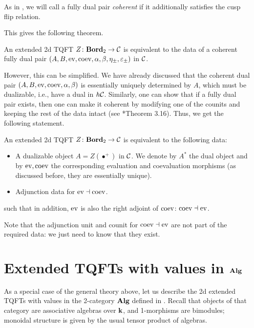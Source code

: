 As in , we will call a fully dual pair \emph{coherent}
if it additionally satisfies the cusp flip relation.

This gives the following theorem.

\begin{theorem}\label{t:2d-etqft-classification1}
  An extended 2d TQFT $Z\colon \mathbf{Bord}_2\to \mathcal{C}$ is equivalent to the
  data of a coherent fully dual pair
  $(A, B, \operatorname{ev}, \operatorname{coev}, \alpha, \beta, \eta_\pm, \varepsilon_\pm)$ in $\mathcal{C}$.
\end{theorem}

However, this can be simplified. We have already discussed that the
coherent dual pair $(A, B, \operatorname{ev}, \operatorname{coev}, \alpha, \beta)$ is essentially
uniquely determined by $A$, which must be dualizable, i.e., have a
dual in $h\mathcal{C}$. Similarly, one can show that if a fully dual pair exists,
then one can make it coherent by modifying one of the counits and keeping
the rest of the data intact (see *{Theorem 3.16}). Thus, we
get the following statement.

\begin{theorem}\label{t:2d-etqft-classification2}
  An extended 2d TQFT $Z\colon \mathbf{Bord}_2\to \mathcal{C}$ is equivalent to the
  following data:
  \begin{itemize}
    \item A dualizable object $A=Z(\bullet^+)$ in $\mathcal{C}$. We denote by
    $A^*$ the dual object and by $\operatorname{ev}, \operatorname{coev}$ the corresponding evaluation
    and coevaluation morphisms
    \textup{(}as discussed before, they are essentially unique\textup{)}.
    \item Adjunction data for $\operatorname{ev}\dashv \operatorname{coev}$.
  \end{itemize}
  such that in addition, $\operatorname{ev}$ is also the right adjoint of $\operatorname{coev}$:
   $\operatorname{coev} \dashv \operatorname{ev}$.
\end{theorem}

Note that the adjunction unit and counit for $\operatorname{coev} \dashv \operatorname{ev}$ are not
part of the required data: we just need to know that they exist.


\section{Extended TQFTs with values in $\mathbf{Alg}$}\label{s:extended-alg}

As a special case of the general theory above, let us describe the 2d
extended TQFTs with values in the 2-category $\mathbf{Alg}$ defined in
. Recall that objects of that category are associative
algebras over $\mathbf{k}$, and 1-morphisms are bimodules; monoidal structure is
given by the usual tensor product of algebras.

